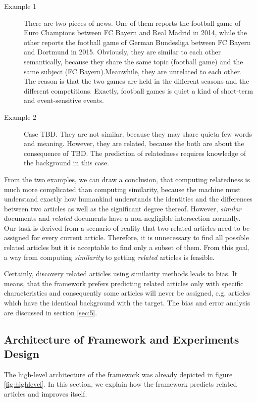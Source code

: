 \begin{description}
\item[Example 1] There are two pieces of news. One of them reports the football game of Euro Champions between FC Bayern and Real Madrid in 2014, while the other reports the football game of German Bundesliga between FC Bayern and Dortmund in 2015. Obviously, they are similar to each other semantically, because they share the same topic (football game) and the same subject (FC Bayern).Meanwhile, they are unrelated to each other. The reason is that the two games are held in the different seasons and the different competitions. Exactly, football games is quiet a kind of short-term and event-sensitive events. 
\item[Example 2] Case TBD. They are not similar, because they may share quieta few words and meaning. However, they are related, because the both are about the consequence of TBD. The prediction of relatedness requires knowledge of the background in this case.
\end{description}

From the two examples, we can draw a conclusion, that computing relatedness is much more complicated than computing similarity, because the machine must understand exactly how humankind understands the identities and the differences between two articles as well as the significant degree thereof. However, \textit{similar} documents and \textit{related} documents have a non-negligible intersection normally. Our task is derived from a scenario of reality that two related articles need to be assigned for every current article. Therefore, it is unnecessary to find all possible related articles but it is acceptable to find only a subset of them. From this goal, a way from computing \textit{similarity} to getting \textit{related} articles is feasible. 

Certainly, discovery related articles using similarity methods leads to bias. It means, that the framework prefers predicting related articles only with specific characteristics and consequently some articles will never be assigned, e.g. articles which have the identical background with the target. The bias and error analysis are discussed in section \ref{sec:5}. 

\subsection{Architecture of Framework and Experiments Design}
\label{sec:4.2}

The high-level architecture of the framework was already depicted in figure \ref{fig:highlevel}. In this section, we explain how the framework predicts related articles and improves itself. 


